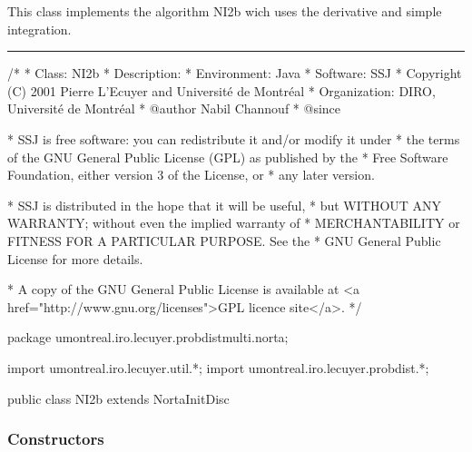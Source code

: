 This class implements the algorithm NI2b wich uses the derivative
  and simple integration.
\bigskip\hrule

\begin{code}
\begin{hide}
/*
 * Class:        NI2b
 * Description:
 * Environment:  Java
 * Software:     SSJ
 * Copyright (C) 2001  Pierre L'Ecuyer and Université de Montréal
 * Organization: DIRO, Université de Montréal
 * @author       Nabil Channouf
 * @since

 * SSJ is free software: you can redistribute it and/or modify it under
 * the terms of the GNU General Public License (GPL) as published by the
 * Free Software Foundation, either version 3 of the License, or
 * any later version.

 * SSJ is distributed in the hope that it will be useful,
 * but WITHOUT ANY WARRANTY; without even the implied warranty of
 * MERCHANTABILITY or FITNESS FOR A PARTICULAR PURPOSE.  See the
 * GNU General Public License for more details.

 * A copy of the GNU General Public License is available at
   <a href="http://www.gnu.org/licenses">GPL licence site</a>.
 */
\end{hide}
package umontreal.iro.lecuyer.probdistmulti.norta;
\begin{hide}
import umontreal.iro.lecuyer.util.*;
import umontreal.iro.lecuyer.probdist.*;
\end{hide}

public class NI2b extends NortaInitDisc \begin{hide}
{
   private int m; /* Number of subintervals for the integration = max.
   		      number of iterations (also named m in the paper,
   		      paragraph "Method NI2" of section 3).*/
   private double delta; /* Small positive parameter to make sure that
                                rho_m is not too close to 1 or -1;
   			     (also named delta in the paper, paragraph
   			     "Method NI2" of section 3)*/
\end{hide}
\end{code}
\subsubsection* {Constructors}

